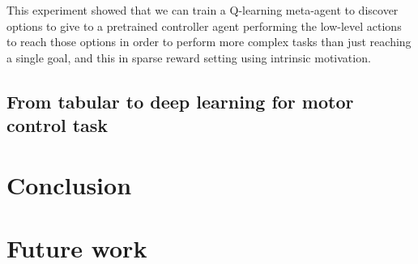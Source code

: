 \documentclass[conference]{IEEEtran}
\begin{document}
This experiment showed that we can train a Q-learning meta-agent to discover options to give to a pretrained controller agent performing the low-level actions to reach those options in order to perform more complex tasks than just reaching a single goal, and this in sparse reward setting using intrinsic motivation. 

\subsection{From tabular to deep learning for motor control task}


\section{Conclusion} \label{sec:conclusion}
\section{Future work} \label{sec:future_work}

\newpage
\printbibliography
\end{document}
